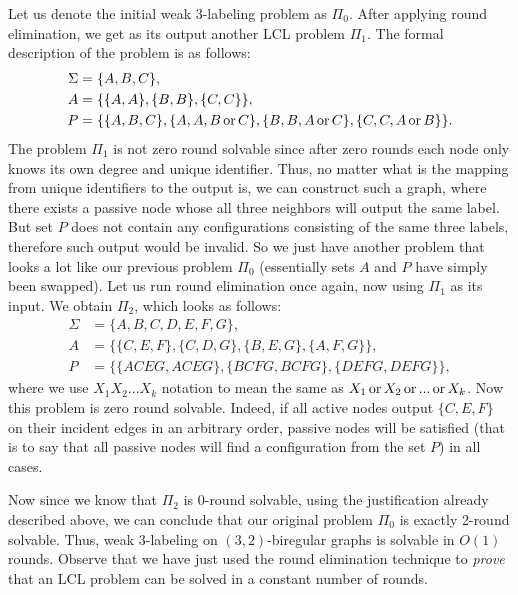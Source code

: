 Let us denote the initial weak 3-labeling problem as $\Pi_0$. After applying round elimination, we get as its
output another LCL problem $\Pi_1$. The formal description of the problem is as follows:
\begin{align*}
\Sigma &= \{A, B, C\}, \\
A &= \{ \{A, A\}, \{B, B\}, \{C, C\}\}, \\
P &= \{ \{A, B ,C\}, \{A, A, B \operatorname{or} C\}, \{B, B, A \operatorname{or} C\}, \{C, C, A \operatorname{or} B\} \}.
\end{align*}
The problem $\Pi_1$ is not zero round solvable since after zero rounds each node only
knows its own degree and unique identifier. Thus, no matter what is the mapping from
unique identifiers to the output is, we can construct such a graph, where there exists
a passive node whose all three neighbors will output the same label. But set $P$ does not
contain any configurations consisting of the same three labels, therefore such
output would be invalid. So we just have another problem that looks a lot like our
previous problem $\Pi_0$ (essentially sets $A$ and $P$ have simply been swapped).
Let us run round elimination once again, now using $\Pi_1$ as its input. We obtain
$\Pi_2$, which looks as follows:
\begin{align*}
\Sigma &= \{A, B, C, D, E, F, G\}, \\
A &= \{ \{C, E, F\}, \{C, D, G\}, \{B, E, G\}, \{A, F, G\}\}, \\
P &= \{ \{ACEG, ACEG\}, \{BCFG, BCFG\}, \{DEFG, DEFG\} \},
\end{align*}
where we use $X_1X_2...X_k$ notation to mean the same as $X_1 \operatorname{or} X_2 \operatorname{or} ... \operatorname{or} X_k$.
Now this problem is zero round solvable. Indeed, if all active nodes output $\{C, E, F\}$
on their incident edges in an arbitrary order, passive nodes will be satisfied (that is to say
that all passive nodes will find a configuration from the set $P$) in all cases.

Now since we know that $\Pi_2$ is 0-round solvable, using the justification already described
above, we can conclude that our original problem $\Pi_0$ is exactly 2-round solvable. Thus,
weak 3-labeling on $(3, 2)$-biregular graphs is solvable in $O(1)$ rounds. Observe that
we have just used the round elimination technique to \emph{prove} that an LCL problem can be
solved in a constant number of rounds.

